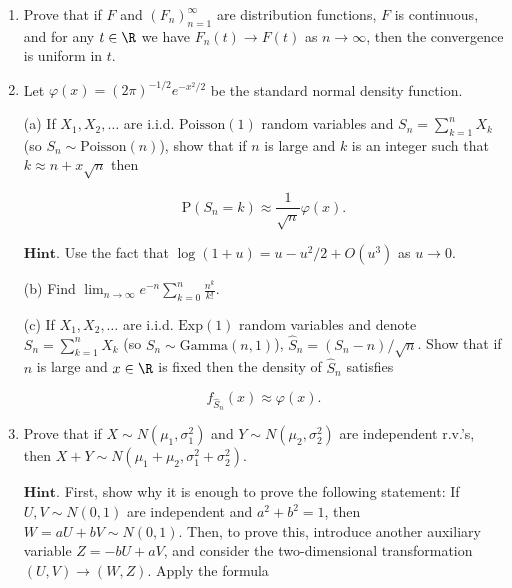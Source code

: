 \begin{enumerate}[label=\arabic*.]
$\textbf{Theorem (The Law of the Iterated Logarithm;
A. Y. Khinchin, 1924).}$

\[
\mathrm{P}\left(\limsup_{n\to\infty} \frac{S_n}{\sqrt{2n \log\log n}} = 1\right) = 1.
\]

\noindent Therefore, by symmetry, also

\[
\mathrm{P}\left(\liminf_{n\to\infty} \frac{S_n}{\sqrt{2n \log\log n}} = -1\right) = 1.
\]

\noindent It follows in particular that, almost surely, the
random walk will cross the origin infinitely many
times.

\item Prove that if $F$ and $(F_n)_{n=1}^\infty$ are
distribution functions, $F$ is continuous, and for
any $t\in \R$ we have $F_n(t)\to F(t)$ as
$n\to\infty$, then the convergence is uniform in $t$.

\item Let $\varphi(x)=(2\pi)^{-1/2} e^{-x^2/2}$ be the
standard normal density function.

(a) If $X_1,X_2,\ldots$ are i.i.d.
$\textrm{Poisson}(1)$ random variables and
$S_n=\sum_{k=1}^n X_k$ (so
$S_n \sim \textrm{Poisson}(n)$), show that if $n$ is
large and $k$ is an integer such that
$k\approx n+x\sqrt{n}$ then

\[
\mathrm{P}(S_n=k) \approx \frac{1}{\sqrt{n}} \varphi(x).
\]

\noindent $\textbf{Hint.}$ Use the fact that
$\log(1+u)=u-u^2/2 + O(u^3)$ as $u\to 0$.

(b) Find
$\lim_{n\to\infty} e^{-n} \sum_{k=0}^n
\frac{n^k}{k!}$.

(c) If $X_1,X_2,\ldots$ are i.i.d. $\textrm{Exp}(1)$
random variables and denote $S_n=\sum_{k=1}^n X_k$
(so $S_n \sim \textrm{Gamma}(n,1)$),
$\hat{S}_n = (S_n-n)/\sqrt{n}$. Show that if $n$ is
large and $x\in \R$ is fixed then the density of
$\hat{S}_n$ satisfies

\[
f_{\hat{S}_n}(x) \approx \varphi(x).
\]

\item Prove that if $X\sim N(\mu_1, \sigma_1^2)$ and
$Y\sim N(\mu_2, \sigma_2^2)$ are independent r.v.'s,
then $X+Y \sim N(\mu_1+\mu_2, \sigma_1^2+\sigma_2^2)$.

$\textbf{Hint.}$ First, show why it is enough to
prove the following statement: If $U,V \sim N(0,1)$
are independent and $a^2+b^2 = 1$, then
$W=aU+bV \sim N(0,1)$. Then, to prove this, introduce
another auxiliary variable $Z=-bU+aV$, and consider
the two-dimensional transformation $(U,V)\to(W,Z)$.
Apply the formula


\end{enumerate}
